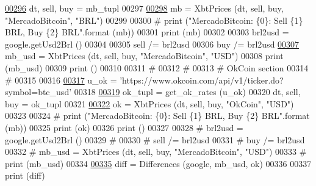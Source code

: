 \begin{DoxyCode}
\hypertarget{raw__urlparser_8py_source.tex_l00296}{}\hyperlink{namespaceraw__urlparser_a9f1ba2a5cd520bb41ac4bee751047679}{00296} dt, sell, buy = mb\_tupl
00297 
\hypertarget{raw__urlparser_8py_source.tex_l00298}{}\hyperlink{namespaceraw__urlparser_a76acf8d303c15079b0560eace3e9720f}{00298} mb = XbtPrices (dt, sell, buy, \textcolor{stringliteral}{"MercadoBitcoin"}, \textcolor{stringliteral}{"BRL"})
00299 
00300 \textcolor{comment}{# print ("MercadoBitcoin: \{0\}: Sell \{1\} BRL, Buy \{2\} BRL".format (mb))}
00301 \textcolor{keywordflow}{print} (mb)
00302  
00303 brl2usd = google.getUsd2Brl ()
00304 
00305 sell /= brl2usd
00306 buy  /= brl2usd 
\hypertarget{raw__urlparser_8py_source.tex_l00307}{}\hyperlink{namespaceraw__urlparser_adb426668060d85f4fbd24135e258a8b3}{00307} mb\_usd = XbtPrices (dt, sell, buy, \textcolor{stringliteral}{"MercadoBitcoin"}, \textcolor{stringliteral}{"USD"})
00308 \textcolor{keywordflow}{print} (mb\_usd)
00309 \textcolor{keywordflow}{print} ()
00310 
00311 \textcolor{comment}{#}
00312 \textcolor{comment}{#}
00313 \textcolor{comment}{# OkCoin section }
00314 \textcolor{comment}{# }
00315 
00316 
\hypertarget{raw__urlparser_8py_source.tex_l00317}{}\hyperlink{namespaceraw__urlparser_a22c1a17803a88426d38d70ad6d4290d2}{00317} u\_ok = \textcolor{stringliteral}{'https://www.okcoin.com/api/v1/ticker.do?symbol=btc\_usd'}
00318 
\hypertarget{raw__urlparser_8py_source.tex_l00319}{}\hyperlink{namespaceraw__urlparser_a511386d80b04970417c26b6493bd2475}{00319} ok\_tupl = get\_ok\_rates (u\_ok)
00320 dt, sell, buy = ok\_tupl
00321 
\hypertarget{raw__urlparser_8py_source.tex_l00322}{}\hyperlink{namespaceraw__urlparser_aa0dcadbc04ec5d09f7a2dabb865000c8}{00322} ok = XbtPrices (dt, sell, buy, \textcolor{stringliteral}{"OkCoin"}, \textcolor{stringliteral}{"USD"})
00323 
00324 \textcolor{comment}{# print ("MercadoBitcoin: \{0\}: Sell \{1\} BRL, Buy \{2\} BRL".format (mb))}
00325 \textcolor{keywordflow}{print} (ok)
00326 \textcolor{keywordflow}{print} ()
00327  
00328 \textcolor{comment}{# brl2usd = google.getUsd2Brl ()}
00329 \textcolor{comment}{#}
00330 \textcolor{comment}{# sell /= brl2usd}
00331 \textcolor{comment}{# buy  /= brl2usd }
00332 \textcolor{comment}{# mb\_usd = XbtPrices (dt, sell, buy, "MercadoBitcoin", "USD")}
00333 \textcolor{comment}{# print (mb\_usd)}
00334 
\hypertarget{raw__urlparser_8py_source.tex_l00335}{}\hyperlink{namespaceraw__urlparser_a86dc49fc55812ccc7eeda441b0fce83c}{00335} diff = Differences (google, mb\_usd, ok)
00336 
00337 \textcolor{keywordflow}{print} (diff)
\end{DoxyCode}

